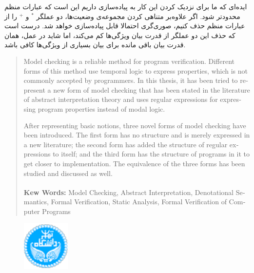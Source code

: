 \documentclass[12pt]{report}
\begin{document}
ایده‌ای که ما برای نزدیک کردن این کار به پیاده‌سازی داریم این است که عبارات منظم محدود‌تر شود. اگر علاوه‌بر متناهی کردن مجموعه‌ی وضعیت‌ها، دو عملگر $^*$ و $^+$ را از عبارات منظم حذف کنیم، صوری‌گری احتمالا قابل پیاده‌سازی خواهد شد. درست است که حذف این دو عملگر از قدرت بیان ویژگی‌ها کم می‌کند، اما شاید در عمل، همان قدرت بیان باقی مانده برای بیان بسیاری از ویژگی‌ها کافی باشد.

\printglossary


\newpage
\begin{latin}
	
	
\end{latin}

\begin{latin}
\begin{abstract}



Model checking is a reliable method for program verification. Different forms of this method use temporal logic to express properties, which is not commonly accepted by programmers. In this thesis, it has been tried to represent a new form of model checking that has been stated in the literature of abstract interpretation theory and uses regular expressions for expressing program properties instead of modal logic.

After representing basic notions, three novel forms of model checking have been introduced. The first form has no structure and is merely expressed in a new literature; the second form has added the structure of regular expressions to itself; and the third form has the structure of programs in it to get closer to implementation.
The equivalence of the three forms has been studied and discussed as well. \\\\

\textbf{Kew Words:}
Model Checking, Abstract Interpretation, Denotational Semantics, Formal Verification, Static Analysis, Formal Verification of Computer Programs



\end{abstract}
\newpage

\begin{figure}
\centering
\includegraphics[height=2.5cm]{UT-Logo.pdf}
\end{figure}
\begin{center}


\end{center}
\end{latin}
\end{document}
